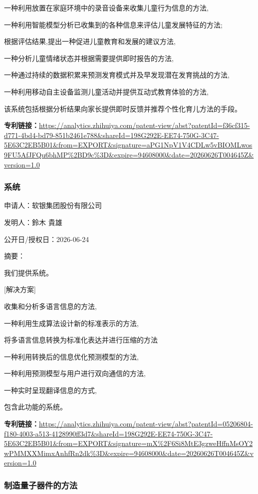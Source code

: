 \documentclass[12pt,a4paper]{ctexart}
\begin{document}
一种利用放置在家庭环境中的录音设备来收集儿童行为信息的方法, 

一种利用智能模型分析已收集到的各种信息来评估儿童发展特征的方法; 

根据评估结果,提出一种促进儿童教育和发展的建议方法, 

一种分析儿童情绪状态并根据需要提供即时报告的方法, 

一种通过持续的数据积累来预测发育模式并及早发现潜在发育挑战的方法, 

一种利用移动自主设备监测儿童活动并提供互动式教育体验的方法, 

该系统包括根据分析结果向家长提供即时反馈并推荐个性化育儿方法的手段。

\noindent\textbf{专利链接：}\url{https://analytics.zhihuiya.com/patent-view/abst?patentId=f36cf315-d771-4bd4-bd79-851b2461e788&shareId=198G292E-EE74-750G-3C47-5E63C2EB5B01&from=EXPORT&signature=aPG1NpV1V4CDLw5vBIOMLwos9FU5AfJFQu6bhMP%2BD9c%3D&expire=94608000&date=20260626T004645Z&version=1.0}

\subsubsection{ 系统 }

申请人：软银集团股份有限公司

发明人：鈴木 貴雄

公开日/授权日：2026-06-24

摘要：

我们提供系统。 

 [解决方案] 

收集和分析多语言信息的方法, 

一种利用生成算法设计新的标准表示的方法, 

将多语言信息转换为标准化表达并进行压缩的方法

一种利用转换后的信息优化预测模型的方法, 

一种利用预测模型与用户进行双向通信的方法, 

一种实时呈现翻译信息的方式, 

包含此功能的系统。

\noindent\textbf{专利链接：}\url{https://analytics.zhihuiya.com/patent-view/abst?patentId=05206804-f180-4003-a513-4128990ff3d7&shareId=198G292E-EE74-750G-3C47-5E63C2EB5B01&from=EXPORT&signature=mX%2F6Si8MtE3gzweHffnMsOY2wPMMXXMimxAnhfRn2dk%3D&expire=94608000&date=20260626T004645Z&version=1.0}

\subsubsection{ 制造量子器件的方法 }
\end{document}
